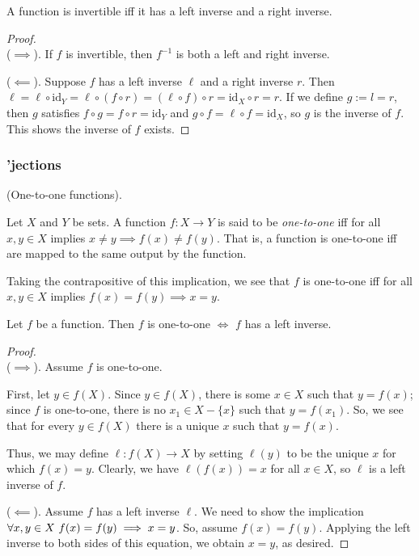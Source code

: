 \begin{theorem}
    A function is invertible iff it has a left inverse and a right inverse.
\end{theorem}

\begin{proof}
    \mbox{} \\

    ($\implies$). If $f$ is invertible, then $f^{-1}$ is both a left and right inverse.

    ($\impliedby$). Suppose $f$ has a left inverse $\ell$ and a right inverse $r$. Then $\ell = \ell \circ \text{id}_Y = \ell \circ (f \circ r) = (\ell \circ f) \circ r = \text{id}_X \circ r = r$. If we define $g := l = r$, then $g$ satisfies $f \circ g = f \circ r = \text{id}_Y$ and $g \circ f = \ell \circ f = \text{id}_X$, so $g$ is the inverse of $f$. This shows the inverse of $f$ exists.
\end{proof}

\subsubsection*{'jections}

\begin{defn}
    (One-to-one functions).

    Let $X$ and $Y$ be sets. A function $f:X \rightarrow Y$ is said to be \textit{one-to-one} iff for all $x, y \in X$ implies $x \neq y \implies f(x) \neq f(y)$. That is, a function is one-to-one iff are mapped to the same output by the function.

    Taking the contrapositive of this implication, we see that $f$ is one-to-one iff for all $x, y \in X$ implies $f(x) = f(y) \implies x = y$.
\end{defn}

\begin{theorem}
    Let $f$ be a function. Then $f$ is one-to-one $\iff$ $f$ has a left inverse.
\end{theorem}

\begin{proof}
    \mbox{} \\

    ($\implies$). Assume $f$ is one-to-one.
    
    First, let $y \in f(X)$. Since $y \in f(X)$, there is some $x \in X$ such that $y = f(x)$; since $f$ is one-to-one, there is no $x_1 \in X - \{x\}$ such that $y = f(x_1)$. So, we see that for every $y \in f(X)$ there is a unique $x$ such that $y = f(x)$.
    
    Thus, we may define $\ell:f(X) \rightarrow X$ by setting $\ell(y)$ to be the unique $x$ for which $f(x) = y$. Clearly, we have $\ell(f(x)) = x$ for all $x \in X$, so $\ell$ is a left inverse of $f$.

    ($\impliedby$). Assume $f$ has a left inverse $\ell$. We need to show the implication $\forall x, y \in X \text{ } f(x) = f(y) \implies x = y$. So, assume $f(x) = f(y)$. Applying the left inverse to both sides of this equation, we obtain $x = y$, as desired. 
\end{proof}

